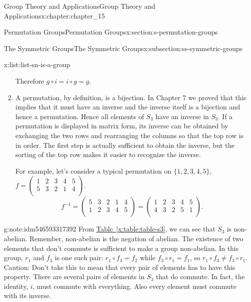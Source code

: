 \documentclass[oneside,10pt,]{book}
\newcommand{\xreffont}{\relax}
\numberwithin{equation}{section}
\begin{document}
\begin{chapterptx}{Group Theory and Applications}{}{Group Theory and Applications}{}{}{x:chapter:chapter_15}
\begin{sectionptx}{Permutation Groups}{}{Permutation Groups}{}{}{x:section:s-permutation-groups}
\begin{subsectionptx}{The Symmetric Groups}{}{The Symmetric Groups}{}{}{x:subsection:ss-symmetric-groups}
\begin{listptx}{\textbf{}}{x:list:list-sn-is-a-group}{}
\begin{enumerate}[label=(\arabic*)]
\begin{equation*}
\end{equation*}
Therefore   \(g\circ i = i\circ g=g\).%
\item{}A permutation, by definition, is a bijection.  In Chapter 7 we proved that this implies that it must have an inverse and the inverse itself is a bijection and hence a permutation.    Hence all elements of \(S_3\) have an inverse in \(S_3\). If a permutation is displayed in matrix form, its inverse can be obtained by exchanging the two rows and rearranging the columns so that the top row is in order. The first step is actually sufficient to obtain the inverse, but the sorting of the top row makes it easier to recognize the inverse.%
\par
For example, let's consider a typical permutation on \(\{1,2,3,4,5\}\), \(f= \left(
\begin{array}{ccccc}
1 & 2 & 3 & 4 & 5 \\
5 & 3 & 2 & 1 & 4 \\
\end{array}
\right)\).%
\begin{equation*}
f^{-1}= \left(
\begin{array}{ccccc}
5 & 3 & 2 & 1 & 4 \\
1 & 2 & 3 & 4 & 5 \\
\end{array} 
\right)= \left(
\begin{array}{ccccc}
1 & 2 & 3 & 4 & 5 \\
4 & 3 & 2 & 5 & 1 \\
\end{array}
\right)\text{.}
\end{equation*}
%
\end{enumerate}
\end{listptx}%
\begin{note}{}{g:note:idm546593317392}%
From \hyperref[x:table:table-s3]{Table~{\xreffont\ref{x:table:table-s3}}}, we can see that \(S_3\) is non-abelian. Remember, non-abelian is the negation of abelian. The existence of two elements that don't commute is sufficient to make a group non-abelian. In this group, \(r_1\) and \(f_3\) is one such pair: \(r_1\circ f_3= f_2\)  while   \(f_3\circ
r_1= f_1\), so \(r_1\circ f_3\neq f_3\circ r_1\).   Caution:  Don't take this to mean that every pair of elements has to have this property.  There are several pairs of elements in \(S_3\) that do  commute.  In fact, the identity, \(i\), must commute with everything.  Also every element must commute with its inverse.%
\end{note}

\end{subsectionptx}
\end{sectionptx}
\end{chapterptx}
\end{document}
